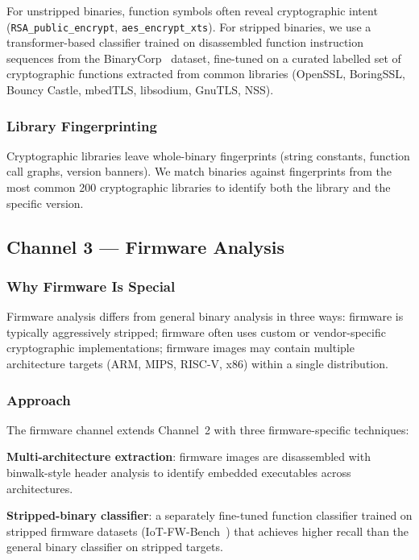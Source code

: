 \documentclass[sigconf,nonacm]{acmart}
\begin{document}
For unstripped binaries, function symbols often reveal cryptographic
intent (\texttt{RSA\_public\_encrypt}, \texttt{aes\_encrypt\_xts}).
For stripped binaries, we use a transformer-based classifier
trained on disassembled function instruction sequences from the
BinaryCorp~\cite{binarycorp2024} dataset, fine-tuned on a curated
labelled set of cryptographic functions extracted from common
libraries (OpenSSL, BoringSSL, Bouncy Castle, mbedTLS, libsodium,
GnuTLS, NSS).

\subsubsection{Library Fingerprinting}

Cryptographic libraries leave whole-binary fingerprints (string
constants, function call graphs, version banners). We match
binaries against fingerprints from the most common 200
cryptographic libraries to identify both the library and the
specific version.

\subsection{Channel 3 --- Firmware Analysis}

\subsubsection{Why Firmware Is Special}

Firmware analysis differs from general binary analysis in three ways:
firmware is typically aggressively stripped; firmware often uses
custom or vendor-specific cryptographic implementations; firmware
images may contain multiple architecture targets (ARM, MIPS, RISC-V,
x86) within a single distribution.

\subsubsection{Approach}

The firmware channel extends Channel~2 with three firmware-specific
techniques:

\textbf{Multi-architecture extraction}: firmware images are
disassembled with binwalk-style header analysis to identify
embedded executables across architectures.

\textbf{Stripped-binary classifier}: a separately fine-tuned
function classifier trained on stripped firmware datasets
(IoT-FW-Bench~\cite{iotfwbench2024}) that achieves higher recall
than the general binary classifier on stripped targets.
\end{document}
